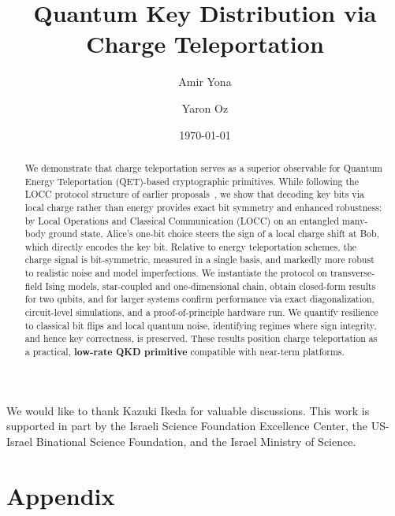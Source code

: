 \documentclass[reprint,prx,amsmath,amssymb,aps,floatfix]{revtex4-2}
\begin{document}
\title{Quantum Key Distribution via Charge Teleportation}
\author{Amir Yona}
\author{Yaron Oz}

\date{\today}

\begin{abstract}

We demonstrate that charge teleportation serves as a superior observable for Quantum Energy Teleportation (QET)-based cryptographic primitives. While following the LOCC protocol structure of earlier proposals~\cite{QKDbyQET}, we show that decoding key bits via local charge rather than energy provides exact bit symmetry and enhanced robustness: by  Local Operations and Classical Communication (LOCC) on an entangled many-body ground state, Alice’s one-bit choice steers the sign of a local charge shift at Bob, which directly encodes the key bit. Relative to energy teleportation schemes, the charge signal is bit-symmetric, measured in a single basis, and markedly more robust to realistic noise and model imperfections. We instantiate the protocol on transverse-field Ising models, star-coupled and one-dimensional chain,  obtain closed-form results for two qubits, and for larger systems confirm performance via exact diagonalization, circuit-level simulations, and a proof-of-principle hardware run. We quantify resilience to classical bit flips and local quantum noise, identifying regimes where sign integrity, and hence key correctness, is preserved. These results position charge teleportation as a practical, \textbf{low-rate QKD primitive} compatible with near-term platforms.

\end{abstract}

\maketitle










\begin{acknowledgments}
We would like to thank Kazuki Ikeda for valuable discussions. This work is supported in part by the Israeli Science Foundation Excellence Center, the US-Israel Binational Science Foundation, and the Israel Ministry of Science.
\end{acknowledgments}

\newpage
\appendix
\section*{Appendix}







\clearpage


\end{document}
